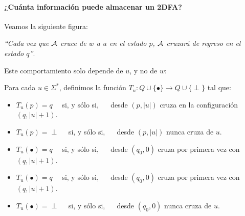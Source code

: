 \paragraph{¿Cuánta información puede almacenar un 2DFA?} Veamos la siguiente figura:
\begin{multicols}{2}

    \textit{``Cada vez que $\mathcal{A}$ cruce de $w$ a $u$ en el estado $p$, $\mathcal{A}$ cruzará de regreso en el estado $q$''}. \medbreak

    Este comportamiento solo depende de $u$, y no de $w$:
\end{multicols}

Para cada $u \in \Sigma^*$, definimos la función $T_u: Q \cup\{\bullet\} \rightarrow Q \cup\{\perp\}$ tal que:
\begin{itemize}
    \item $T_u(p) = q \quad$ si, y sólo si, $\quad$ desde $(p, |u|)$ cruza en la configuración $(q, |u|+1)$.
    \item $T_u(p) = \perp \quad$ si, y sólo si, $\quad$ desde $(p, |u|)$ nunca cruza de $u$.
    \item $T_u(\bullet) = q \quad$ si, y sólo si, $\quad$ desde $(q_0,0)$ cruza por primera vez con $(q, |u| + 1)$.
    \item $T_u(\bullet) = q \quad$ si, y sólo si, $\quad$ desde $(q_0,0)$ cruza por primera vez con $(q, |u| + 1)$.
    \item $T_u(\bullet) = \perp \quad$ si, y sólo si, $\quad$ desde $(q_0,0)$ nunca cruza de $u$.
\end{itemize}

